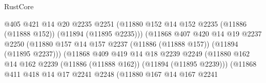 \begin{lexlean}{RustCore}
\begin{coremodule}
                                      @405
                                      @421
                                      @14
                                      @20
                                      @2235
                                      @2251
                                      (@11880
                                        @152
                                        @14
                                        @152
                                        @2235
                                        (@11886 (@11888 @152))
                                        (@11894 (@11895 @2235)))
                                      (@11868
                                        @407
                                        @420
                                        @14
                                        @19
                                        @2237
                                        @2250
                                        (@11880
                                          @157
                                          @14
                                          @157
                                          @2237
                                          (@11886 (@11888 @157))
                                          (@11894 (@11895 @2237)))
                                        (@11868
                                          @409
                                          @419
                                          @14
                                          @18
                                          @2239
                                          @2249
                                          (@11880
                                            @162
                                            @14
                                            @162
                                            @2239
                                            (@11886 (@11888 @162))
                                            (@11894 (@11895 @2239)))
                                          (@11868
                                            @411
                                            @418
                                            @14
                                            @17
                                            @2241
                                            @2248
                                            (@11880
                                              @167
                                              @14
                                              @167
                                              @2241

\end{coremodule}
\end{lexlean}
